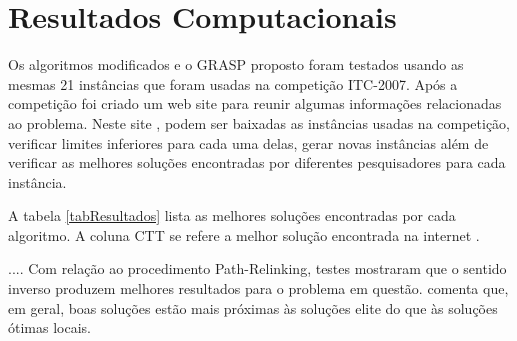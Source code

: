 \documentclass[11pt]{article}
\begin{document}
\section{Resultados Computacionais}
\label{sec:resultados}

Os algoritmos modificados e o GRASP proposto foram testados usando as mesmas 21 instâncias que foram usadas na competição ITC-2007. Após a competição foi criado um web site para reunir algumas informações relacionadas ao problema. Neste site \cite{ctt}, podem ser baixadas as instâncias usadas na competição, verificar limites inferiores para cada uma delas, gerar novas instâncias além de verificar as melhores soluções encontradas por diferentes pesquisadores para cada instância.

A tabela \ref{tabResultados} lista as melhores soluções encontradas por cada algoritmo. A coluna CTT se refere a melhor solução encontrada na internet \cite{ctt}.

.... Com relação ao procedimento Path-Relinking, testes mostraram que o sentido inverso produzem melhores resultados para o problema em questão. \cite{grasp_resende_ribeiro} comenta que, em geral, boas soluções estão mais próximas às soluções elite do que às soluções ótimas locais.
\end{document}
